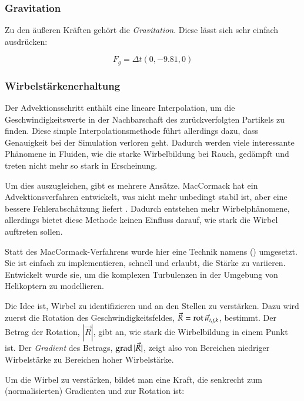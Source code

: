 \subsubsection{Gravitation}

Zu den äußeren Kräften gehört die \emph{Gravitation}. Diese lässt sich
sehr einfach ausdrücken:

\begin{equation}
F_g = \Delta t (0,-9.81,0)
\end{equation}

\subsubsection{Wirbelstärkenerhaltung}

Der Advektionsschritt enthält eine lineare Interpolation, um die
Geschwindigkeitswerte in der Nachbarschaft des zurückverfolgten Partikels zu
finden. Diese simple Interpolationsmethode führt allerdings dazu, dass
Genauigkeit bei der Simulation verloren geht. Dadurch werden viele interessante
Phänomene in Fluiden, wie die starke Wirbelbildung bei Rauch, gedämpft und
treten nicht mehr so stark in Erscheinung.

Um dies auszugleichen, gibt es mehrere Ansätze. MacCormack hat ein
Advektionsverfahren entwickelt, was nicht mehr unbedingt stabil ist, aber eine
bessere Fehlerabschätzung liefert \cite{Selle2008}\cite{Crane2007}. Dadurch
entstehen mehr Wirbelphänomene, allerdings bietet diese Methode keinen Einfluss
darauf, wie stark die Wirbel auftreten sollen.

Statt des MacCormack-Verfahrens wurde hier eine Technik namens
 () umgesetzt. Sie ist einfach zu implementieren, schnell und
erlaubt, die Stärke zu variieren. Entwickelt wurde sie, um die komplexen
Turbulenzen in der Umgebung von Helikoptern zu modellieren\cite{Steinhoff1994}.

Die Idee ist, Wirbel zu identifizieren und an den 
Stellen zu verstärken. Dazu wird zuerst die Rotation des Geschwindigkeitsfeldes,
$\vec{R} = \operatorname*{rot} \vec{u}_{i,j,k}$, bestimmt. Der Betrag der Rotation,
$|\vec{R}|$, gibt an, wie stark die Wirbelbildung in einem Punkt ist. Der
\emph{Gradient} des Betrags, $\operatorname*{grad} |\vec{R}|$, zeigt also
von Bereichen niedriger Wirbelstärke zu Bereichen hoher Wirbelstärke.

Um die Wirbel zu verstärken, bildet man eine Kraft, die senkrecht zum
(normalisierten) Gradienten und zur Rotation ist:

